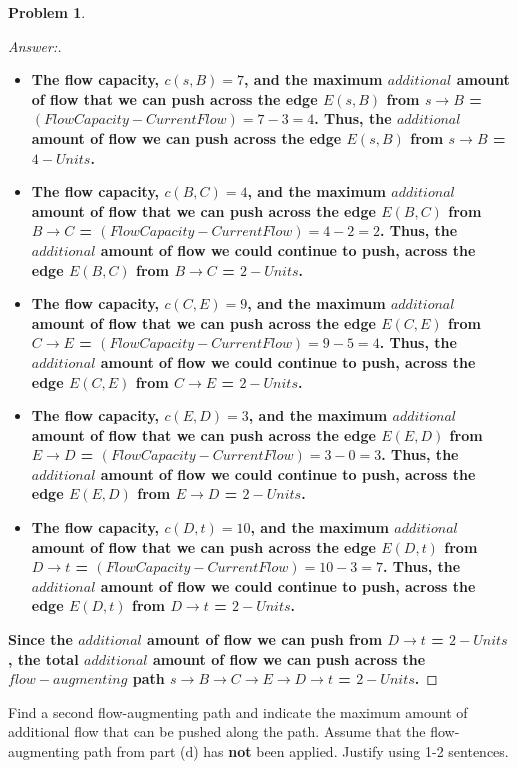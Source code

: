 \documentclass[11pt]{article}
\theoremstyle{definition}
\theoremstyle{definition}
\newtheorem{required}{Problem}
\theoremstyle{definition}
\begin{document}
\begin{required}
\begin{enumerate}[label=(\alph*)]
\begin{proof}[Answer:]
\begin{itemize}
\item \textbf{The flow capacity, $c(s, B) = 7$, and the maximum $additional$ amount of flow that we can push across the edge  $E(s, B)$ from $s \to B$ = $(Flow Capacity - Current Flow) = 7 - 3 = 4$. Thus, the $additional$ amount of flow we can push across the edge $E(s, B)$ from $s \to B$ = $4-Units$.}
\item \textbf{The flow capacity, $c(B, C) = 4$, and the maximum $additional$ amount of flow that we can push across the edge  $E(B, C)$ from $B \to C$ = $(Flow Capacity - Current Flow) = 4 - 2 = 2$. Thus, the $additional$ amount of flow we could continue to push, across the edge $E(B, C)$ from $B \to C$ = $2-Units$.}
\item \textbf{The flow capacity, $c(C, E) = 9$, and the maximum $additional$ amount of flow that we can push across the edge  $E(C, E)$ from $C \to E$ = $(Flow Capacity - Current Flow) = 9 - 5 = 4$. Thus, the $additional$ amount of flow we could continue to push, across the edge $E(C, E)$ from $C \to E$ = $2-Units$.}
\item \textbf{The flow capacity, $c(E, D) = 3$, and the maximum $additional$ amount of flow that we can push across the edge  $E(E, D)$ from $E \to D$ = $(Flow Capacity - Current Flow) = 3 - 0 = 3$. Thus, the $additional$ amount of flow we could continue to push, across the edge $E(E, D)$ from $E \to D$ = $2-Units$.}
\item \textbf{The flow capacity, $c(D, t) = 10$, and the maximum $additional$ amount of flow that we can push across the edge  $E(D, t)$ from $D \to t$ = $(Flow Capacity - Current Flow) = 10 - 3 = 7$. Thus, the $additional$ amount of flow we could continue to push, across the edge $E(D, t)$ from $D \to t$ = $2-Units$.}
\end{itemize}
\item \textbf{Since the $additional$ amount of flow we can push from $D \to t$ = $2-Units$, the total $additional$ amount of flow we can push across the $flow-augmenting$ path $s \to B \to C \to E \to D \to t$ = \color{red}$2-Units$\color{black}.}

\end{proof}


\item Find a second flow-augmenting path and indicate the maximum amount of additional flow that can be pushed along the path. Assume that the flow-augmenting path from part (d) has \textbf{not} been applied. Justify using 1-2 sentences.


\end{enumerate}
\end{required}
\end{document}
